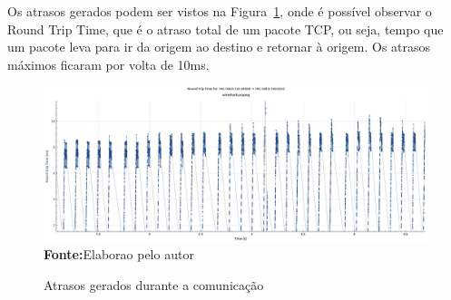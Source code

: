 Os atrasos gerados podem ser vistos na Figura~\ref{fig:delay}, onde é possível observar o Round Trip Time, que é o atraso total de um pacote TCP, ou seja, tempo que um pacote leva para ir da origem ao destino e retornar à origem. Os atrasos máximos ficaram por volta de 10ms. 

\begin{figure}[ht]
	\caption{Atrasos gerados durante a comunicação}
	\begin{center}
		\includegraphics[scale=0.35]{imagens/delay.jpg}\\
		{\small \textbf{Fonte:}Elaborao pelo autor}
    \end{center}\label{fig:delay}
\end{figure}

